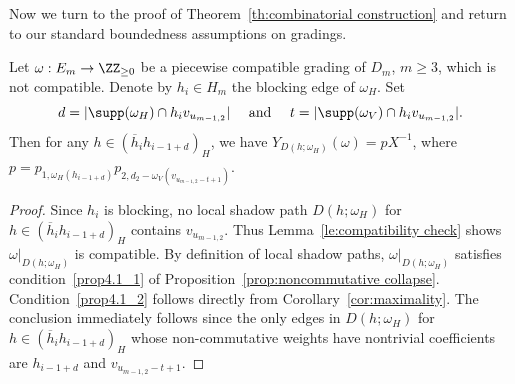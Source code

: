 Now we turn to the proof of Theorem~\ref{th:combinatorial construction} and return to our standard boundedness assumptions on gradings.
\begin{lemma}
 \label{le:noncommutative collapse}
 Let $\omega:E_m\to\ZZ_{\ge0}$ be a piecewise compatible grading of $D_m$, $m\ge3$, which is not compatible.
 Denote by $h_i\in H_m$ the blocking edge of $\omega_H$. 
 Set 
 \[d=|\supp(\omega_H)\cap h_iv_{u_{m-1,2}}|\quad\text{ and }\quad t=|\supp(\omega_V)\cap h_iv_{u_{m-1,2}}|.\]
 Then for any $h\in(\overline{h}_ih_{i-1+d})_H$, we have $Y_{D(h;\omega_H)}(\omega)=pX^{-1}$, where $p=p_{1,\omega_H(h_{i-1+d})}p_{2,d_2-\omega_V(v_{u_{m-1,2}-t+1})}$.
\end{lemma}
\begin{proof}
 Since $h_i$ is blocking, no local shadow path $D(h;\omega_H)$ for $h\in(\overline{h}_ih_{i-1+d})_H$ contains $v_{u_{m-1,2}}$.
 Thus Lemma~\ref{le:compatibility check} shows $\omega|_{D(h;\omega_H)}$ is compatible.
 By definition of local shadow paths, $\omega|_{D(h;\omega_H)}$ satisfies condition~\ref{prop4.1_1} of Proposition~\ref{prop:noncommutative collapse}.
 Condition~\ref{prop4.1_2} follows directly from Corollary~\ref{cor:maximality}.
 The conclusion immediately follows since the only edges in $D(h;\omega_H)$ for $h\in(\overline{h}_ih_{i-1+d})_H$ whose non-commutative weights have nontrivial coefficients are $h_{i-1+d}$ and $v_{u_{m-1,2}-t+1}$.
\end{proof}

